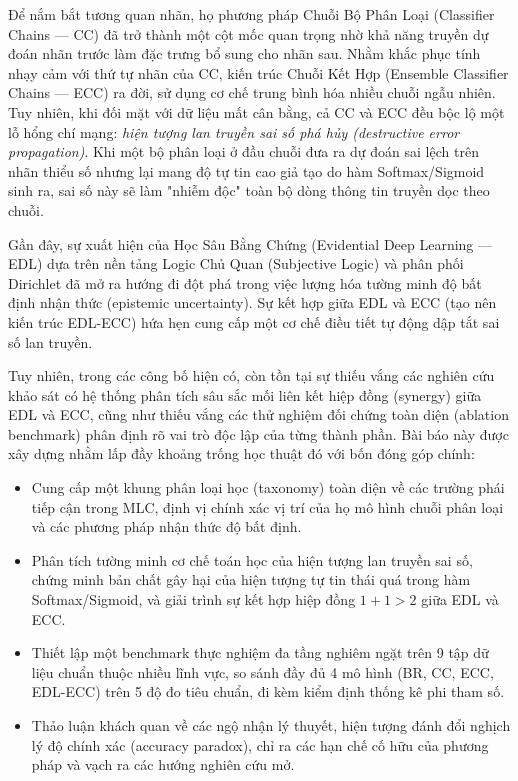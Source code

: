 \documentclass[1p,times]{elsarticle}
\begin{document}
Để nắm bắt tương quan nhãn, họ phương pháp Chuỗi Bộ Phân Loại (Classifier Chains — CC) \citep{read2011classifier} đã trở thành một cột mốc quan trọng nhờ khả năng truyền dự đoán nhãn trước làm đặc trưng bổ sung cho nhãn sau. Nhằm khắc phục tính nhạy cảm với thứ tự nhãn của CC, kiến trúc Chuỗi Kết Hợp (Ensemble Classifier Chains — ECC) ra đời, sử dụng cơ chế trung bình hóa nhiều chuỗi ngẫu nhiên. Tuy nhiên, khi đối mặt với dữ liệu mất cân bằng, cả CC và ECC đều bộc lộ một lỗ hổng chí mạng: \textit{hiện tượng lan truyền sai số phá hủy (destructive error propagation)}. Khi một bộ phân loại ở đầu chuỗi đưa ra dự đoán sai lệch trên nhãn thiểu số nhưng lại mang độ tự tin cao giả tạo do hàm Softmax/Sigmoid sinh ra, sai số này sẽ làm "nhiễm độc" toàn bộ dòng thông tin truyền dọc theo chuỗi.

Gần đây, sự xuất hiện của Học Sâu Bằng Chứng (Evidential Deep Learning — EDL) \citep{sensoy2018evidential} dựa trên nền tảng Logic Chủ Quan (Subjective Logic) \citep{josang2016subjective} và phân phối Dirichlet đã mở ra hướng đi đột phá trong việc lượng hóa tường minh độ bất định nhận thức (epistemic uncertainty). Sự kết hợp giữa EDL và ECC (tạo nên kiến trúc EDL-ECC) hứa hẹn cung cấp một cơ chế điều tiết tự động dập tắt sai số lan truyền.

Tuy nhiên, trong các công bố hiện có, còn tồn tại sự thiếu vắng các nghiên cứu khảo sát có hệ thống phân tích sâu sắc mối liên kết hiệp đồng (synergy) giữa EDL và ECC, cũng như thiếu vắng các thử nghiệm đối chứng toàn diện (ablation benchmark) phân định rõ vai trò độc lập của từng thành phần. Bài báo này được xây dựng nhằm lấp đầy khoảng trống học thuật đó với bốn đóng góp chính:
\begin{itemize}
    \item Cung cấp một khung phân loại học (taxonomy) toàn diện về các trường phái tiếp cận trong MLC, định vị chính xác vị trí của họ mô hình chuỗi phân loại và các phương pháp nhận thức độ bất định.
    \item Phân tích tường minh cơ chế toán học của hiện tượng lan truyền sai số, chứng minh bản chất gây hại của hiện tượng tự tin thái quá trong hàm Softmax/Sigmoid, và giải trình sự kết hợp hiệp đồng $1 + 1 > 2$ giữa EDL và ECC.
    \item Thiết lập một benchmark thực nghiệm đa tầng nghiêm ngặt trên 9 tập dữ liệu chuẩn thuộc nhiều lĩnh vực, so sánh đầy đủ 4 mô hình (BR, CC, ECC, EDL-ECC) trên 5 độ đo tiêu chuẩn, đi kèm kiểm định thống kê phi tham số.
    \item Thảo luận khách quan về các ngộ nhận lý thuyết, hiện tượng đánh đổi nghịch lý độ chính xác (accuracy paradox), chỉ ra các hạn chế cố hữu của phương pháp và vạch ra các hướng nghiên cứu mở.
\end{itemize}
\end{document}
